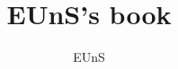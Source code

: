 \documentclass[chapter,oneside]{oblivoir}
\begin{document}
    
    \title{EUnS's book}
    \author{ EUnS }

    \maketitle

    \tableofcontents
    
    
    

    

    

    
\end{document}
